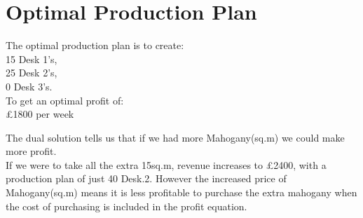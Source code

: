 \documentclass{article}
\begin{document}

\section{Optimal Production Plan}
  The optimal production plan is to create:\\ 15 Desk 1's,\\ 25 Desk 2's,\\ 0 Desk 3's.\\ To get an optimal profit of:\\ \pounds1800 per week
  
The dual solution tells us that if we had more Mahogany(sq.m) we could make more profit. \\

If we were to take all the extra 15sq.m, revenue increases to \pounds2400, with a production plan of just 40 Desk.2. However the increased price of Mahogany(sq.m) means it is less profitable to purchase the extra mahogany when the cost of purchasing is included in the profit equation.
\end{document}
